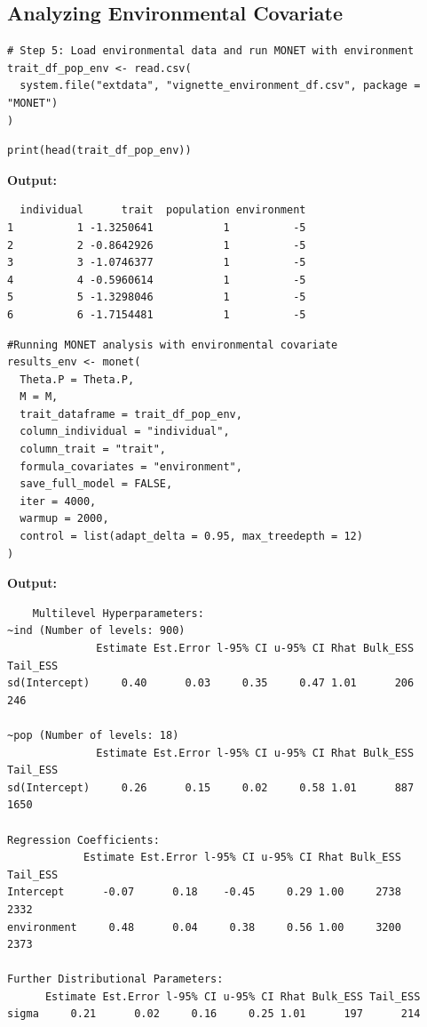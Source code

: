 \documentclass[11pt]{article}
\begin{document}
\subsection{Analyzing Environmental Covariate}

\begin{lstlisting}
# Step 5: Load environmental data and run MONET with environment
trait_df_pop_env <- read.csv(
  system.file("extdata", "vignette_environment_df.csv", package = "MONET")
)
\end{lstlisting}

\begin{lstlisting}
print(head(trait_df_pop_env))
\end{lstlisting}

\textbf{Output:}
\begin{verbatim}
  individual      trait  population environment
1          1 -1.3250641           1          -5
2          2 -0.8642926           1          -5
3          3 -1.0746377           1          -5
4          4 -0.5960614           1          -5
5          5 -1.3298046           1          -5
6          6 -1.7154481           1          -5
\end{verbatim}

\begin{lstlisting}
#Running MONET analysis with environmental covariate
results_env <- monet(
  Theta.P = Theta.P,
  M = M,
  trait_dataframe = trait_df_pop_env,
  column_individual = "individual",
  column_trait = "trait",
  formula_covariates = "environment",
  save_full_model = FALSE,
  iter = 4000,           
  warmup = 2000,         
  control = list(adapt_delta = 0.95, max_treedepth = 12)  
)
\end{lstlisting}

\textbf{Output:}
\begin{verbatim}
    Multilevel Hyperparameters:
~ind (Number of levels: 900) 
              Estimate Est.Error l-95% CI u-95% CI Rhat Bulk_ESS Tail_ESS
sd(Intercept)     0.40      0.03     0.35     0.47 1.01      206      246

~pop (Number of levels: 18) 
              Estimate Est.Error l-95% CI u-95% CI Rhat Bulk_ESS Tail_ESS
sd(Intercept)     0.26      0.15     0.02     0.58 1.01      887     1650

Regression Coefficients:
            Estimate Est.Error l-95% CI u-95% CI Rhat Bulk_ESS Tail_ESS
Intercept      -0.07      0.18    -0.45     0.29 1.00     2738     2332
environment     0.48      0.04     0.38     0.56 1.00     3200     2373

Further Distributional Parameters:
      Estimate Est.Error l-95% CI u-95% CI Rhat Bulk_ESS Tail_ESS
sigma     0.21      0.02     0.16     0.25 1.01      197      214
\end{verbatim}
\end{document}
